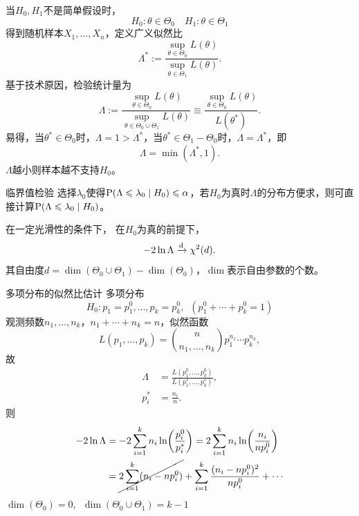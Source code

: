 当$H_0,H_1$不是简单假设时，
\[
	H_0:\theta \in \varTheta_0\quad H_1:\theta \in \varTheta_1
\]
得到随机样本$X_1,\ldots,X_n$，定义广义似然比
\begin{equation}\label{eq:ps-generalized-likelihood-ratio}
	\Lambda^\ast := \frac{\sup_{\theta\in\varTheta_0}L(\theta)}{\sup_{\theta\in\varTheta_1}L(\theta)}.
\end{equation}
基于技术原因，检验统计量为
\begin{equation}
	\Lambda := \frac{\sup_{\theta\in\varTheta_0}L(\theta)}{\sup_{\theta\in\varTheta_0\cup\varTheta_1}L(\theta)} \equiv \frac{\sup_{\theta\in\varTheta_0}L(\theta)}{L(\theta^\ast)}.
\end{equation}
易得，当$\theta^\ast \in \varTheta_0$时，$\Lambda = 1 > \Lambda^\ast$，当$\theta^\ast \in \varTheta_1 - \varTheta_0$时，$\Lambda = \Lambda^\ast$，即
\[
	\Lambda%
	= \min(\Lambda^\ast,1).
\]
$\Lambda$越小则样本越不支持$H_0$。
\begin{method}{临界值检验}{}
	选择$\lambda_0$使得$\P(\Lambda \leqslant \lambda_0 \mid H_0) \leqslant \alpha$，若$H_0$为真时$\Lambda$的分布方便求，则可直接计算$\P(\Lambda \leqslant \lambda_0 \mid H_0)$。
\end{method}
\begin{theorem}{}{}
	在一定光滑性的条件下，%
	在$H_0$为真的前提下，
	\begin{equation}
		-2\ln\Lambda \dto \ChiSqDist(d).
	\end{equation}
	其自由度$d = \dim(\varTheta_0 \cup \varTheta_1) - \dim(\varTheta_0)$，$\dim$表示自由参数的个数。
\end{theorem}
\begin{example}{多项分布的似然比估计}{}
	多项分布
	\[
		H_0:p_1 = p_1^0,\ldots,p_k = p_k^0,\enspace(p_1^0 + \cdots + p_k^0 = 1)
	\]
	观测频数$n_1,\ldots,n_k$，$n_1 + \cdots + n_k = n$，似然函数
	\[
		L(p_1,\ldots,p_k) = \binom n{n_1,\ldots,n_k}p_1^{n_1}\cdots p_k^{n_k},
	\]
	故
	\begin{align*}
		\Lambda &= \frac{L(p_1^0,\ldots,p_k^0)}{L(p_1^\ast,\ldots,p_k^\ast)},\\
		p_i^\ast &= \frac{n_i}n.
	\end{align*}
	则
	\begin{align*}
		-2\ln\Lambda &= -2\sum_{i=1}^k n_i\ln\biggp{\frac{p_i^0}{p_i^\ast}} = 2\sum_{i=1}^kn_i\ln\biggp{\frac{n_i}{np_i^0}}\\
		&= \cancel{2\sum_{i=1}^k(n_i - np_i^0)} + \sum_{i=1}^k\frac{(n_i - np_i^0)^2}{np_i^0} + \cdots
	\end{align*}
	$\dim(\varTheta_0) = 0,\enspace\dim(\varTheta_0 \cup \varTheta_1) = k - 1$
\end{example}
